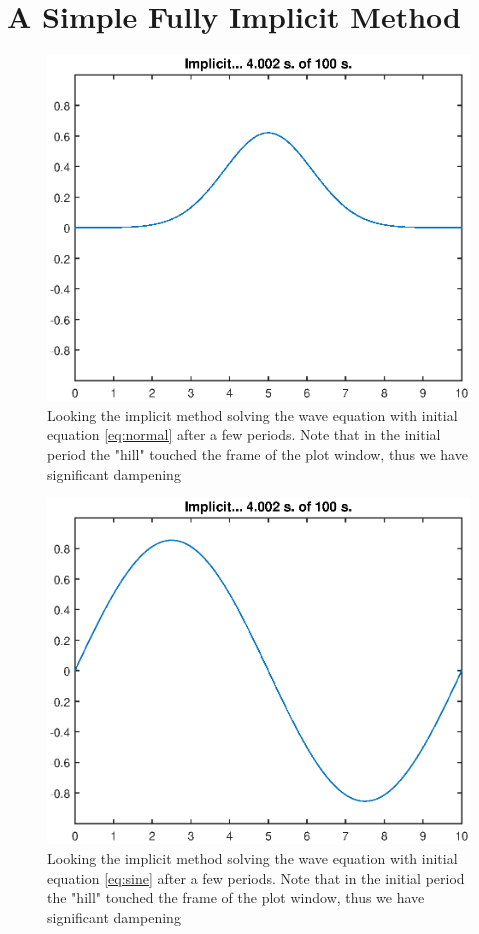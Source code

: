 \documentclass[11pt]{article}
\begin{document}
\section{A Simple Fully Implicit Method}
\begin{figure}[H]
	\centering
	\includegraphics[width=1\textwidth]{../implicitNormal}
	\caption{Looking the implicit method solving the wave equation with initial equation 
	\ref{eq:normal} after a few periods. Note that in the initial period the "hill" touched the frame of the plot window, thus we have significant dampening}
	\label{fig:implicitNormal}
\end{figure}
\begin{figure}[H]
	\centering
	\includegraphics[width=1\textwidth]{../implicitSine}
	\caption{Looking the implicit method solving the wave equation with initial equation 
	\ref{eq:sine} after a few periods. Note that in the initial period the "hill" touched the frame of the plot window, thus we have significant dampening}
	\label{fig:implicitSine}
\end{figure}
\end{document}
